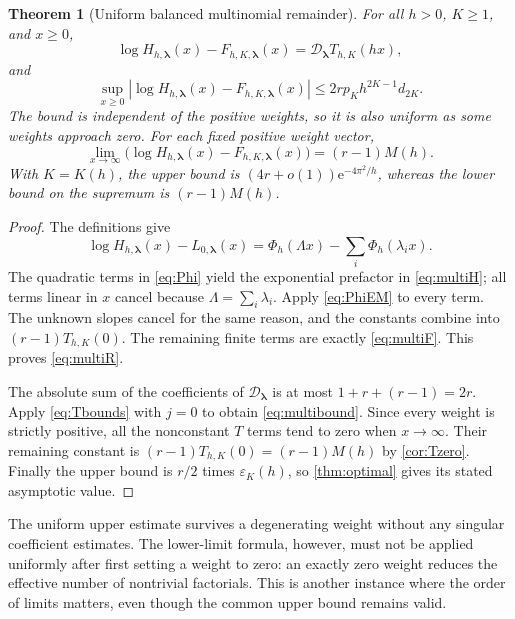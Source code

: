 \documentclass[11pt,a4paper]{article}
\numberwithin{equation}{section}
\newtheorem{theorem}{Theorem}[section]
\theoremstyle{definition}
\newcommand{\ee}{\mathrm e}
\newcommand{\eps}{\varepsilon}
\begin{document}
\begin{theorem}[Uniform balanced multinomial remainder]
\label{thm:multinomial}
For all $h>0$, $K\ge1$, and $x\ge0$,
\begin{equation}
\log H_{h,\boldsymbol\lambda}(x)-F_{h,K,\boldsymbol\lambda}(x)
 =\mathcal D_{\boldsymbol\lambda}T_{h,K}(hx),
\label{eq:multiR}
\end{equation}
and
\begin{equation}
\sup_{x\ge0}
|\log H_{h,\boldsymbol\lambda}(x)-F_{h,K,\boldsymbol\lambda}(x)|
 \le 2r p_Kh^{2K-1}d_{2K}.
\label{eq:multibound}
\end{equation}
The bound is independent of the positive weights, so it is also uniform as some weights approach zero. For each fixed positive weight vector,
\begin{equation}
\lim_{x\to\infty}
 \bigl(\log H_{h,\boldsymbol\lambda}(x)-F_{h,K,\boldsymbol\lambda}(x)\bigr)
 =(r-1)M(h).
\label{eq:multilower}
\end{equation}
With $K=K(h)$, the upper bound is $(4r+o(1))\ee^{-4\pi^2/h}$, whereas the lower bound on the supremum is $(r-1)M(h)$.
\end{theorem}
\begin{proof}
The definitions give
\[
\log H_{h,\boldsymbol\lambda}(x)-L_{0,\boldsymbol\lambda}(x)
 =\Phi_h(\Lambda x)-\sum_i\Phi_h(\lambda_i x).
\]
The quadratic terms in \eqref{eq:Phi} yield the exponential prefactor in \eqref{eq:multiH}; all terms linear in $x$ cancel because $\Lambda=\sum_i\lambda_i$. Apply \eqref{eq:PhiEM} to every term. The unknown slopes cancel for the same reason, and the constants combine into $(r-1)T_{h,K}(0)$. The remaining finite terms are exactly \eqref{eq:multiF}. This proves \eqref{eq:multiR}.

The absolute sum of the coefficients of $\mathcal D_{\boldsymbol\lambda}$ is at most $1+r+(r-1)=2r$. Apply \eqref{eq:Tbounds} with $j=0$ to obtain \eqref{eq:multibound}. Since every weight is strictly positive, all the nonconstant $T$ terms tend to zero when $x\to\infty$. Their remaining constant is $(r-1)T_{h,K}(0)=(r-1)M(h)$ by \cref{cor:Tzero}. Finally the upper bound is $r/2$ times $\eps_K(h)$, so \cref{thm:optimal} gives its stated asymptotic value.
\end{proof}

The uniform upper estimate survives a degenerating weight without any singular coefficient estimates. The lower-limit formula, however, must not be applied uniformly after first setting a weight to zero: an exactly zero weight reduces the effective number of nontrivial factorials. This is another instance where the order of limits matters, even though the common upper bound remains valid.
\end{document}
